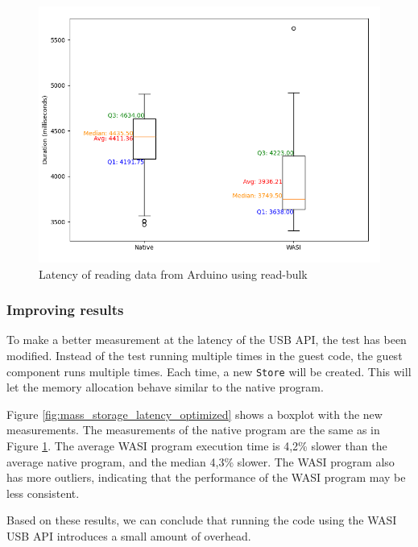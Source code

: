 \begin{figure}[H]
  \centering
  \includegraphics[width=1\textwidth]{images/mass_storage_1000_runs_naive.png}
  \caption{Latency of reading data from Arduino using read-bulk}
  \label{fig:mass_storage_latency_naive}
\end{figure}



\subsubsection{Improving results}

To make a better measurement at the latency of the \acrshort{USB} \acrshort{API}, the test has been modified. Instead of the test running multiple times in the guest code, the guest component runs multiple times. Each time, a new \texttt{Store} will be created. This will let the memory allocation behave similar to the native program.

Figure \ref{fig:mass_storage_latency_optimized} shows a boxplot with the new measurements. The measurements of the native program are the same as in Figure \ref{fig:mass_storage_latency_naive}. The average \acrshort{WASI} program execution time is 4,2\% slower than the average native program, and the median 4,3\% slower. The \acrshort{WASI} program also has more outliers, indicating that the performance of the \acrshort{WASI} program may be less consistent.

Based on these results, we can conclude that running the code using the \acrshort{WASI} \acrshort{USB} \acrshort{API} introduces a small amount of overhead.

